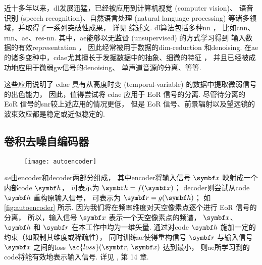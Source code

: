 近十多年以来，\ac{dl}发展迅猛，已经被应用到计算机视觉 (computer vision)、
语音识别 (speech recognition)、自然语言处理 (natural language processing)
等诸多领域，并取得了一系列突破性成果，
详见  综述文.
\ac{dl}算法包括多种\ac{nn} \cite{bengio2009,leCun2015,schmidhuber2015}，
比如\ac{cnn}、\ac{rnn}、\ac{ae}、\ac{res-nn}.
其中，\ac{ae}能够以无监督 (unsupervised) 的方式学习得到
输入数据的有效\ac{representation} \cite{bourlard1988}，
因此经常被用于数据的\ac{dim-reduction}\cite{hinton2006,wang2014}
和\ac{denoising}\cite{xie2012,lu2013,bengio2013}.
在\ac{ae}的诸多变种中，\ac{cdae}尤其擅长于发掘数据中的抽象、细微的特征 \cite{du2017}，
并且已经被成功地应用于微弱\ac{gw}信号的\ac{denoising}\cite{shen2017}、
单声道音源的分离\cite{grais2017}、等等.

这些应用说明了 \ac{cdae} 具有从高度时变 (temporal-variable)
的数据中提取微弱信号的出色能力，
因此，值得尝试将 \ac{cdae} 应用于 EoR 信号的分离.
尽管待分离的 EoR 信号的\ac{snr}较上述应用的情况更低，
但是 EoR 信号、前景辐射以及望远镜的波束效应都是稳定或近似稳定的.

\subsection{卷积去噪自编码器}
\label{sec:cdae}

\begin{figure}[htp]
  \centering
  \texttt{[image: autoencoder]}
  \label{fig:autoencoder}
\end{figure}

\emph{\ac{ae}}由\ac{encoder}和\ac{decoder}两部分组成，
其中\ac{encoder}将输入信号 $\B{x}$ 映射成一个内部\ac{code} $\B{h}$，
可表示为 $\B{h} = f(\B{x})$；
\ac{decoder}则尝试从\ac{code} $\B{h}$ 重构原输入信号，
可表示为 $\B{r} = g(\B{h})$；
如\autoref{fig:autoencoder} 所示.
因为我们将在频率维度对天空像素点逐个进行 EoR 信号的分离，
所以，输入信号 $\B{x}$ 表示一个天空像素点的频谱，
$\B{x}$、$\B{h}$ 和 $\B{r}$ 在本工作中均为一维矢量.
通过对\ac{code} $\B{h}$ 施加一定的约束（如限制其维度或稀疏性），
同时训练\ac{ae}使得重构信号 $\B{r}$ 与输入信号 $\B{x}$
之间的\acl{loss} $\ac{loss}(\B{r}, \,\B{x})$ 达到最小，
则\ac{ae}所学习到的\ac{code}将能有效地表示输入信号.
详见 , 第 14 章.

